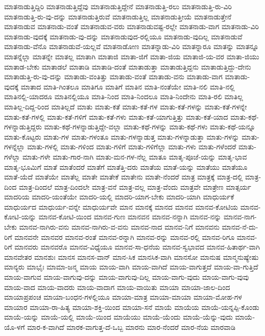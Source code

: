 {ಮಾತನಾಡುತ್ತಿದ್ದಿರಿ
ಮಾತನಾಡುತ್ತಿದ್ದೆವು
ಮಾತನಾಡುತ್ತಿದ್ದೇನೆ
ಮಾತನಾಡುತ್ತಿ-ರಲು
ಮಾತನಾಡುತ್ತಿ-ರು-ವಿರಿ
ಮಾತನಾಡುತ್ತಿ-ರು-ವು-ದನ್ನು
ಮಾತನಾಡುತ್ತಿರುವೆ
ಮಾತನಾಡುತ್ತಿಲ್ಲ
ಮಾತನಾಡುತ್ತೀಯೆ
ಮಾತನಾಡುತ್ತೇನೆ
ಮಾತನಾಡುವ
ಮಾತನಾಡು-ವಂತೆ
ಮಾತನಾಡುವ-ವರು
ಮಾತನಾಡುವಷ್ಟ-ರಲ್ಲೇ
ಮಾತನಾಡು-ವಾಗ
ಮಾತನಾಡು-ವಿರಿ
ಮಾತನಾಡು-ವುದಕ್ಕೆ
ಮಾತನಾಡು-ವು-ದನ್ನು
ಮಾತನಾಡುವುದ-ರಲ್ಲಿಯೂ
ಮಾತನಾಡು-ವುದಿಲ್ಲ
ಮಾತನಾಡುವೆ
ಮಾತನಾಡು-ವೆನೊ
ಮಾತನಾಡುವೆ-ಯಲ್ಲವೆ
ಮಾತನಾಡೋಣ
ಮಾತನ್ನಾಡು-ವಿರಿ
ಮಾತನ್ನಾರೂ
ಮಾತನ್ನು
ಮಾತನ್ನೂ
ಮಾತನ್ನೆಲ್ಲಾ
ಮಾತನ್ನೇ
ಮಾತಲ್ಲ
ಮಾತಾಗಿ
ಮಾತಾಜಿ
ಮಾತಾ-ಜಿಗೆ
ಮಾತಾ-ಜಿಯ
ಮಾತಾಜಿ-ಯ-ವರ
ಮಾತಾ-ಜಿಯು
ಮಾತಾಡ-ಬೇಕು
ಮಾತಾಡಲೆ
ಮಾತಾಡಿ
ಮಾತಾಡಿ-ದಂತೆ
ಮಾತಾಡುತ್ತಾ
ಮಾತಾಡುತ್ತಿದ್ದನು
ಮಾತಾಡುತ್ತಿದ್ದು-ದೇನು
ಮಾತಾಡುತ್ತಿ-ರು-ವು-ದನ್ನು
ಮಾತಾಡು-ವಂತಿತ್ತು
ಮಾತಾಡು-ವಂತೆ
ಮಾತಾಡು-ವನು
ಮಾತಾಡು-ವಾಗ
ಮಾತಾಡು-ವುದಕ್ಕೆ
ಮಾತಾದ
ಮಾತಿ-ಗಿಂತಲೂ
ಮಾತಿಗೂ
ಮಾತಿಗೆ
ಮಾತಿನ
ಮಾತಿ-ನಂತೆಯೇ
ಮಾತಿ-ನಲಿ
ಮಾತಿ-ನಲ್ಲಿ
ಮಾತಿನಲ್ಲಿ-ಯಾದರೂ
ಮಾತಿನಲ್ಲಿಯೂ
ಮಾತಿ-ನಿಂದ
ಮಾತಿ-ನಿಂದಲೂ
ಮಾತಿ-ನಿಂದೇನು
ಮಾತಿ-ರಲಿ
ಮಾತಿಲ್ಲ
ಮಾತಿಲ್ಲ-ದಿದ್ದ-ರಿಂದ
ಮಾತಿಲ್ಲದೆ
ಮಾತು
ಮಾತು-ಕತೆ
ಮಾತು-ಕತೆ-ಗಳ
ಮಾತು-ಕತೆ-ಗಳನ್ನು
ಮಾತು-ಕತೆ-ಗಳನ್ನೇ
ಮಾತು-ಕತೆ-ಗಳಲ್ಲಿ
ಮಾತು-ಕತೆ-ಗಳಿಗೆ
ಮಾತು-ಕತೆ-ಗಳು
ಮಾತು-ಕತೆ-ಯಾಗುತ್ತಿತ್ತು
ಮಾತು-ಕತೆ-ಯಾದ
ಮಾತು-ಕಥೆ-ಗಳನ್ನಾಡುತ್ತಿದ್ದರು
ಮಾತು-ಕಥೆ-ಗಳನ್ನಾಡುತ್ತಿದ್ದೇ-ವಲ್ಲಾ
ಮಾತು-ಕಥೆ-ಗಳನ್ನು
ಮಾತು-ಕಥೆ-ಗಳು
ಮಾತು-ಕಥೆ-ಯನ್ನೂ
ಮಾತು-ಕೊಟ್ಟರು
ಮಾತು-ಗಳ
ಮಾತು-ಗಳಂತೂ
ಮಾತು-ಗಳನ್ನಾಡುತ್ತ
ಮಾತು-ಗಳನ್ನಾಡುತ್ತಾ
ಮಾತು-ಗಳನ್ನು
ಮಾತು-ಗಳನ್ನೆಲ್ಲಾ
ಮಾತು-ಗಳಲ್ಲಿ
ಮಾತು-ಗಳಿಂದ
ಮಾತು-ಗಳಿಗೆ
ಮಾತು-ಗಳಿಗೆಲ್ಲಾ
ಮಾತು-ಗಳು
ಮಾತು-ಗಳೆಂದರೆ
ಮಾತು-ಗಳೆಲ್ಲಾ
ಮಾತು-ಗಳೇ
ಮಾತು-ಗಾರ-ನಾಗಿ
ಮಾತು-ಮನ-ಗಳ-ನೆಲ್ಲ
ಮಾತೂ
ಮಾತೃ-ಪೂಜೆ-ಯನ್ನು
ಮಾತೃ-ಭಾವ
ಮಾತೃ-ಭೂಮಿಗೆ
ಮಾತೆ
ಮಾತೆಂದರೆ
ಮಾತೆಗೆ
ಮಾತೆತ್ತಿ-ದರು
ಮಾತೆಯ
ಮಾತೆ-ಯನ್ನು
ಮಾತೆಯು
ಮಾತೆಯೂ
ಮಾತೆ-ಯೆದೆ
ಮಾತೆಯೇ
ಮಾತೆಲ್ಲ
ಮಾತೇ
ಮಾತೇಕೆ
ಮಾತೇನು
ಮಾತೇ-ನೆಂದರೆ
ಮಾತ್ರ
ಮಾತ್ರಕ್ಕೆ
ಮಾತ್ರ-ದಲ್ಲಿ
ಮಾತ್ರ-ದಿಂದ
ಮಾತ್ರ-ದಿಂದಲೆ
ಮಾತ್ರ-ದಿಂದಲೇ
ಮಾತ್ರ-ವನೆ
ಮಾತ್ರ-ವಲ್ಲ
ಮಾತ್ರ-ವೆಂದು
ಮಾತ್ರವೇ
ಮಾತ್ರೇಣ
ಮಾತ್ಸರ್ಯ
ಮಾದರಿಯ
ಮಾದರಿ-ಯಂತೆಯೇ
ಮಾದರಿ-ಯಲ್ಲಿ
ಮಾದರಿ-ಯಾಗ-ಬೇಕು
ಮಾದರಿ-ಯಾಗಿ
ಮಾಧುರ್ಯಕೆ
ಮಾಧುರ್ಯದ
ಮಾಧುರ್ಯ-ವನ್ನೇ
ಮಾಧುರ್ಯವೇ
ಮಾನ
ಮಾನಕ್ಕೆ
ಮಾನದ
ಮಾನವ
ಮಾನವ-ಕೋಟಿಯ
ಮಾನವ-ಕೋಟಿ-ಯನ್ನು
ಮಾನವ-ಕೋಟಿ-ಯಿಂದ
ಮಾನವ-ಗುಣ
ಮಾನವನ
ಮಾನವ-ನನ್ನಾಗಿ
ಮಾನವ-ನನ್ನು
ಮಾನವ-ನಾಗ-ಬೇಕು
ಮಾನವ-ನಾಗಿರು-ವನು
ಮಾನವ-ನಾಗಿರು-ವ-ವನು
ಮಾನವ-ನಾದ
ಮಾನವ-ನಿಗೆ
ಮಾನವನು
ಮಾನವ-ನೆ-ದು-ರಿಗೆ
ಮಾನವನೇ
ಮಾನವರ
ಮಾನವ-ರಂತೆ
ಮಾನವ-ರನ್ನಾಗಿ
ಮಾನವ-ರನ್ನು
ಮಾನವ-ರಲ್ಲಿ
ಮಾನವ-ರಿಗೂ
ಮಾನವ-ರಿಗೆ
ಮಾನವರು
ಮಾನವರೊ
ಮಾನವ-ವಿಧ್ಯೆಯೂ
ಮಾನವ-ಸಾ-ಧನೆಯ
ಮಾನವ-ಸ್ವಭಾವದ
ಮಾನವ-ಹಿತಾರ್ಥ-ವಾಗಿ
ಮಾನವೇತರ
ಮಾನಶುಃ
ಮಾನಸ
ಮಾನಸ-ವಾನ್
ಮಾನ-ಸಿಕ
ಮಾನಸಿಕ-ವಾಗಿ
ಮಾನಸೋ
ಮಾನುಷ
ಮಾನ್ಮನುಷ್ಯೇಷು
ಮಾನ್ಯರು
ಮಾಭೈಃ
ಮಾಮಾ-ಜನ್ಮ
ಮಾಯ
ಮಾಯ-ವಾಗಿ
ಮಾಯ-ವಾಗಿದೆ
ಮಾಯ-ವಾಗುತ್ತದೆ
ಮಾಯ-ವಾ-ಗುತ್ತಿದೆ
ಮಾಯ-ವಾಗುವ
ಮಾಯ-ವಾಗುವು-ದನ್ನು
ಮಾಯ-ವಾಗುವು-ದಿಲ್ಲ
ಮಾಯ-ವಾಗು-ವುದು
ಮಾಯ-ವಾಗು-ವುವು
ಮಾಯ-ವಾದ
ಮಾಯ-ವಾದರು
ಮಾಯ-ವಾದಾಗ
ಮಾಯ-ವಾಯಿತು
ಮಾಯಾ
ಮಾಯಾ-ಜಾಲ-ದಿಂದ
ಮಾಯಾಪ್ರಪಂಚ
ಮಾಯಾ-ಬಂಧನ-ಗಳಲ್ಲಿಯೂ
ಮಾಯಾ-ಮಾತ್ರ
ಮಾಯಾ-ಮಾಯಾ
ಮಾಯಾ-ಮೋಹ-ಗಳ
ಮಾಯಾರ
ಮಾಯಾ-ರಾ-ಹಿತ್ಯ
ಮಾಯಾ-ಶಕ್ತಿ-ಯಿಂದ
ಮಾಯಾ-ಸನೆ
ಮಾಯೆ
ಮಾಯೆಯ
ಮಾಯೆ-ಯನ್ನಪ್ಪಿ-ಕೊಂಡು
ಮಾಯೆ-ಯನ್ನು
ಮಾಯೆ-ಯಲ್ಲಿ
ಮಾಯೆ-ಯಿಂದ
ಮಾಯೆಯು
ಮಾಯೆ-ಯೆಂದು
ಮಾಯೆ-ಯೆನ್ನು-ವುದು
ಮಾಯೆ-ಯೊ-ಳಗೆ
ಮಾರ-ಕ-ವಾಗಿದೆ
ಮಾರಕ-ವಾಗುತ್ತ-ದೆ-ಒಬ್ಬ
ಮಾರನು
ಮಾರ-ನೆಂದರೆ
ಮಾರ-ನೆಯ
ಮಾರವಾಡಿ
}
